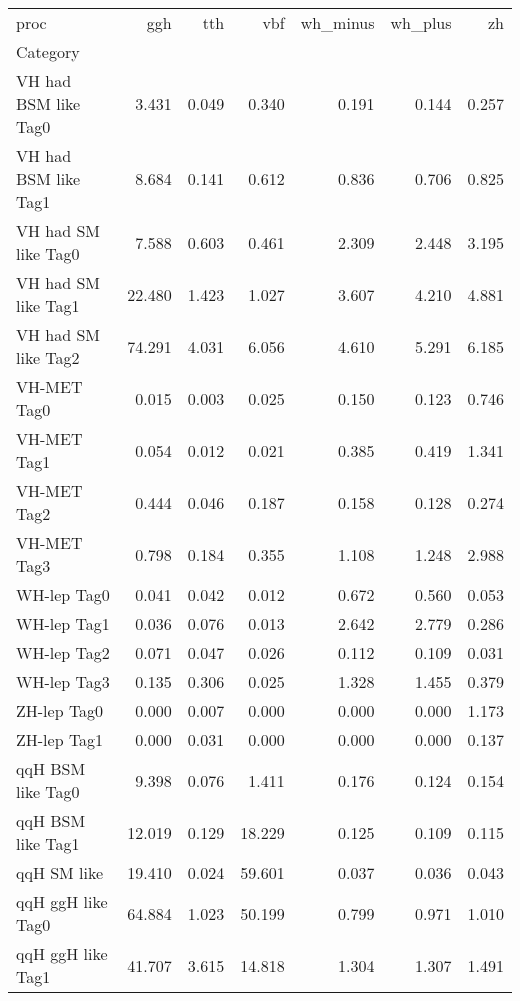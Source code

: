 \begin{tabular}{lrrrrrr}
\toprule
proc &     ggh &    tth &     vbf &  wh_{minus} &  wh_{plus} &     zh \\
Category             &         &        &         &             &            &        \\
\midrule
VH had BSM like Tag0 &   3.431 &  0.049 &   0.340 &       0.191 &      0.144 &  0.257 \\
VH had BSM like Tag1 &   8.684 &  0.141 &   0.612 &       0.836 &      0.706 &  0.825 \\
VH had SM like Tag0  &   7.588 &  0.603 &   0.461 &       2.309 &      2.448 &  3.195 \\
VH had SM like Tag1  &  22.480 &  1.423 &   1.027 &       3.607 &      4.210 &  4.881 \\
VH had SM like Tag2  &  74.291 &  4.031 &   6.056 &       4.610 &      5.291 &  6.185 \\
VH-MET Tag0          &   0.015 &  0.003 &   0.025 &       0.150 &      0.123 &  0.746 \\
VH-MET Tag1          &   0.054 &  0.012 &   0.021 &       0.385 &      0.419 &  1.341 \\
VH-MET Tag2          &   0.444 &  0.046 &   0.187 &       0.158 &      0.128 &  0.274 \\
VH-MET Tag3          &   0.798 &  0.184 &   0.355 &       1.108 &      1.248 &  2.988 \\
WH-lep Tag0          &   0.041 &  0.042 &   0.012 &       0.672 &      0.560 &  0.053 \\
WH-lep Tag1          &   0.036 &  0.076 &   0.013 &       2.642 &      2.779 &  0.286 \\
WH-lep Tag2          &   0.071 &  0.047 &   0.026 &       0.112 &      0.109 &  0.031 \\
WH-lep Tag3          &   0.135 &  0.306 &   0.025 &       1.328 &      1.455 &  0.379 \\
ZH-lep Tag0          &   0.000 &  0.007 &   0.000 &       0.000 &      0.000 &  1.173 \\
ZH-lep Tag1          &   0.000 &  0.031 &   0.000 &       0.000 &      0.000 &  0.137 \\
qqH BSM like Tag0    &   9.398 &  0.076 &   1.411 &       0.176 &      0.124 &  0.154 \\
qqH BSM like Tag1    &  12.019 &  0.129 &  18.229 &       0.125 &      0.109 &  0.115 \\
qqH SM like          &  19.410 &  0.024 &  59.601 &       0.037 &      0.036 &  0.043 \\
qqH ggH like Tag0    &  64.884 &  1.023 &  50.199 &       0.799 &      0.971 &  1.010 \\
qqH ggH like Tag1    &  41.707 &  3.615 &  14.818 &       1.304 &      1.307 &  1.491 \\
\bottomrule
\end{tabular}
